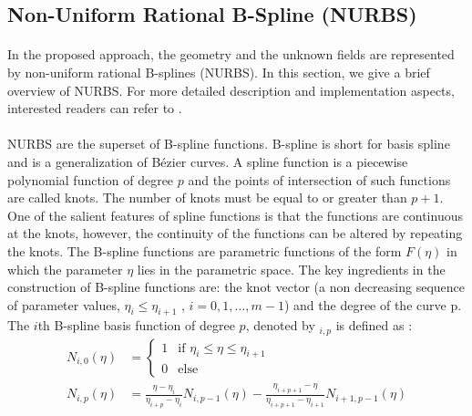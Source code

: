 \subsection{Non-Uniform Rational B-Spline (NURBS)}
\label{lr_sec:NURBS}
\paragraph{}
In the proposed approach, the geometry and the unknown fields are represented by non-uniform rational B-splines (NURBS).
In this section, we give a brief overview of NURBS.
For more detailed description and implementation aspects, interested readers can refer to \citep{Pie1997,NGUYEN201589}.
\paragraph{}
NURBS are the superset of B-spline functions.
B-spline is short for basis spline and is a generalization of Bézier curves.
A spline function is a piecewise polynomial function of degree $p$ and the points of intersection of such functions are called knots.
The number of knots must be equal to or greater than $p + 1$.
One of the salient features of spline functions is that the functions are continuous at the knots, however, the continuity of the functions can be altered by repeating the knots.
The B-spline functions are parametric functions of the form $F(\eta)$ in which the parameter $\eta$ lies in the parametric space.
The key ingredients in the construction of B-spline functions are: the knot vector (a non decreasing sequence of parameter values, $\eta_i \leq \eta_{i+1}$ , $i = 0,1,\dots,m -1$) and the degree of the curve p. The $i$th B-spline basis function of degree $p$, denoted by $_{i,p}$ is defined as \citep{Pie1997}:
\begin{equation}
    \begin{aligned}
        N_{i,0}(\eta) &=
            \begin{cases}
                1   & \text{if } \eta_i \leq \eta \leq \eta_{i+1}    \\
                0   & \text{else}
            \end{cases}\\
        N_{i,p}(\eta) &= 
            \frac{\eta - \eta_i}{\eta_{i+p}-\eta_i}     N_{i,p-1}(\eta) - 
            \frac{\eta_{i+p+1}-\eta}{\eta_{i+p+1} - \eta_{i+1}}     N_{i+1,p-1}(\eta)
    \end{aligned}
    \label{lr_nurbs_basis}
\end{equation}


